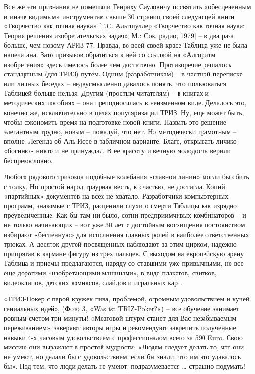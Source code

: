 \documentclass[11pt,a4paper]{article}
\begin{document}
Все же эти признания не помешали Генриху Сауловичу посвятить «обесцененным и
иначе видимым» инструментам свыше 30 страниц своей следующей книги «Творчество
как точная наука» [Г.С. Альтшуллер «Творчество как точная наука: Теория
  решения изобретательских задач», М.: Сов. радио, 1979] -- в два раза больше,
чем новому АРИЗ-77. Правда, во всей своей красе Таблица уже не была
напечатана. Зато призывов обратиться к ней со ссылкой на «Алгоритм
изобретения» здесь имелось более чем достаточно. Противоречие решалось
стандартным (для ТРИЗ) путем. Одним (разработчикам) -- в частной переписке или
личных беседах -- недвусмысленно давалось понять, что пользоваться Таблицей
больше нельзя. Другим (простым читателям) -- в книгах и методических пособиях
-- она преподносилась в неизменном виде. Делалось это, конечно же,
исключительно в целях популяризации ТРИЗ. Ну, еще может быть, чтобы сэкономить
время на подготовке новой книги. Назвать это решение элегантным трудно, новым
-- пожалуй, что нет. Но методически грамотным -- вполне. Легенда об Аль-Иссе в
табличном варианте. Благо, открывать личико «богиню» никто и не принуждал. В
ее красоту и вечную молодость верили беспрекословно.

Любого рядового тризовца подобные колебания «главной линии» могли бы сбить с
толку. Но простой народ траурная весть, к счастью, не достигла. Копий
«партийных» документов на всех не хватало. Разработчики компьютерных программ,
знакомые с ТРИЗ, расценили слухи о смерти Таблицы как изрядно
преувеличенные. Как бы там ни было, сотни предприимчивых комбинаторов -- и не
только начинающих -- вот уже 30 лет с достойным восхищения постоянством
избирают «бесценную» для исполнения главных ролей в наиболее ответственных
трюках. А десяток-другой посвященных наблюдают за этим цирком, надежно
припрятав в кармане фигуру из трех пальцев. С выходом на европейскую арену
Таблица и приемы предлагаются, наряду со ставшими уже привычными, но все еще
дорогими «изобретающими машинами», в виде плакатов, свитков, видеоклипов,
детских комиксов, слайдов и игральных карт.

«ТРИЗ-Покер с парой кружек пива, проблемой, огромным удовольствием и кучей
гениальных идей», (Фото 3, «Was ist TRIZ-Poker?«) -- все обучение занимает
ровным счетом три минуты! «Мозговой штурм станет для Вас незабываемым
переживанием», заверяют авторы игры и рекомендуют закрепить полученные навыки
4-х часовым удовольствием с профессионалом всего за 590 Euro. Свою миссию они
выражают в простой мудрости: «Людям следует делать то, что они не умеют, но
делали бы с удовольствием, если бы знали, что им это удавалось бы». Под тем,
что люди делать не умеют, подразумевается … страшно подумать!
\end{document}
